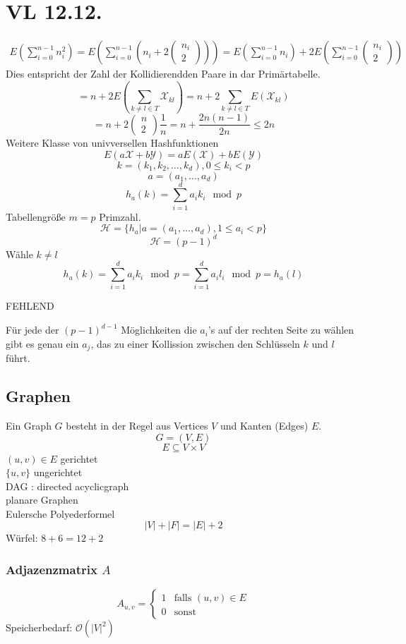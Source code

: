 \documentclass[a4paper,draft,twoside,10pt]{report}
\begin{document}
\chapter{VL 12.12.}
\begin{align*}E(\sum_{i=0}^{n-1}n^2_i)=E(\sum_{i=0}^{n-1}(n_i+2(\begin{array}{c}n_i\\2\end{array})))=E(\sum_{i=0}^{n-1}n_i)+2E(\sum_{i=0}^{n-1}(\begin{array}{c}n_i\\2\end{array}))\end{align*}
Dies entspricht der Zahl der Kollidierendden Paare in dar Primärtabelle.
\[=n+2E(\sum_{k\ne l\in T} \mathcal X_{kl})=n+2\sum_{k\ne l\in T} E(\mathcal X_{kl})\]
\[=n+2(\begin{array}{c}n\\2\end{array})\frac{1}{n}=n+\frac{2n(n-1)}{2n}\le 2n\]
Weitere Klasse von univversellen Hashfunktionen
\[E(a\mathcal X+ b\mathcal Y) =aE(\mathcal X)+bE(\mathcal Y)\]
\[k=(k_1,k_2,\hdots, k_d) ,0\le k_i <p\]\[a=(a_1, \hdots,a_d)\]
\[h_a(k)=\sum_{i=1}^d a_ik_i \mod p\]
 Tabellengröße $m=p$ Primzahl.
\[\mathcal H=\{h_a|a=(a_1,\hdots ,a_d), 1\le a_i<p\}\]
\[\mathcal H =(p-1)^d\]
Wähle $k\ne l$
\[h_a(k)=\sum_{i=1}^d a_i k_i \mod p =\sum_{i=1}^d a_i l_i \mod p =h_a(l)\]

FEHLEND

Für jede der $(p-1)^{d-1}$ Möglichkeiten die $a_i$'s auf der rechten Seite zu wählen gibt es genau ein $a_j$, das zu einer Kollission zwischen den Schlüsseln $k$ und $l$ führt.


\section{Graphen}
Ein Graph $G$ besteht in der Regel aus Vertices $V$ und Kanten (Edges) $E$.
\[G=(V,E)\]
\[E\subseteq V\times V\]
$(u,v)\in E$ gerichtet\\
$\{u,v\}$ ungerichtet\\
DAG : directed acyclicgraph\\
planare Graphen\\
Eulersche Polyederformel
\[|V|+|F|=|E|+2\]
Würfel: $8+6=12+2$\\

\subsection{Adjazenzmatrix $A$}
\[A_{u,v} = \left\{\begin{array}{ll}1&\mbox{falls $(u,v)\in E$}\\0&\mbox{sonst}\end{array}\right.\]
Speicherbedarf: $\mathcal O(|V|^2)$\\
 
\end{document}
